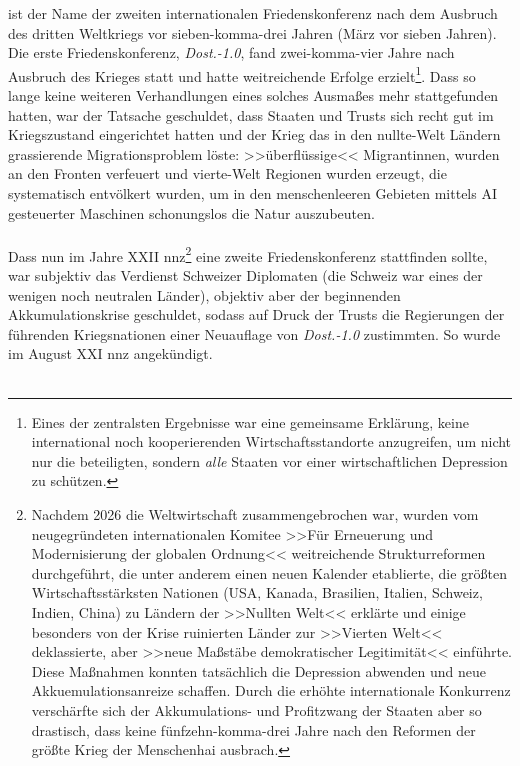 \game{} ist der Name der zweiten internationalen Friedenskonferenz nach dem
Ausbruch des dritten Weltkriegs vor sieben-komma-drei Jahren (März vor sieben
Jahren).
Die erste Friedenskonferenz, \emph{Dost.-1.0}, fand zwei-komma-vier Jahre nach
Ausbruch des Krieges statt und hatte weitreichende Erfolge erzielt\footnote{
  Eines der zentralsten Ergebnisse war eine gemeinsame Erklärung, keine
  international noch kooperierenden Wirtschaftsstandorte anzugreifen, um nicht
  nur die beteiligten, sondern \emph{alle} Staaten vor einer wirtschaftlichen
  Depression zu schützen.
}.
Dass so lange keine weiteren Verhandlungen eines solches Ausmaßes mehr
stattgefunden hatten, war der Tatsache geschuldet, dass Staaten und Trusts sich
recht gut im Kriegszustand eingerichtet hatten und der Krieg das in den
nullte-Welt Ländern grassierende Migrationsproblem löste: >>überflüssige<<
Migrantinnen, wurden an den Fronten verfeuert und vierte-Welt Regionen wurden
erzeugt, die systematisch entvölkert wurden, um in den menschenleeren Gebieten
mittels AI gesteuerter Maschinen schonungslos die Natur auszubeuten.\\\\
Dass nun im Jahre XXII \ac{nnz}\footnote{
  Nachdem 2026 die Weltwirtschaft zusammengebrochen war, wurden vom
  neugegründeten internationalen Komitee >>Für Erneuerung und Modernisierung der
  globalen Ordnung<< weitreichende Strukturreformen durchgeführt, die
  unter anderem einen neuen Kalender etablierte, die größten
  Wirtschaftsstärksten Nationen (USA, Kanada, Brasilien, Italien, Schweiz,
  Indien, China) zu Ländern der >>Nullten Welt<< erklärte und einige besonders
  von der Krise ruinierten Länder zur >>Vierten Welt<< deklassierte, aber >>neue
  Maßstäbe demokratischer Legitimität<< einführte.
  Diese Maßnahmen konnten tatsächlich die Depression abwenden und neue
  Akkuemulationsanreize schaffen. 
  Durch die erhöhte internationale Konkurrenz verschärfte sich der
  Akkumulations- und Profitzwang der Staaten aber so drastisch, dass keine
  fünfzehn-komma-drei Jahre nach den Reformen der größte Krieg der Menschenhai
  ausbrach.
} eine zweite Friedenskonferenz stattfinden sollte, war subjektiv das Verdienst
Schweizer Diplomaten (die Schweiz war eines der wenigen noch neutralen Länder),
objektiv aber der beginnenden Akkumulationskrise geschuldet, sodass auf Druck
der Trusts die Regierungen der führenden Kriegsnationen einer Neuauflage von
\emph{Dost.-1.0} zustimmten. 
So wurde im August XXI \ac{nnz} \game{} angekündigt.\\\\

